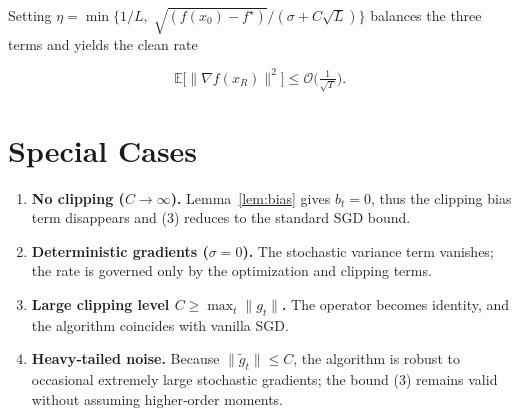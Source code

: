 \documentclass{article}
\newcommand{\E}{\mathbb{E}}
\begin{document}
Setting $\eta = \min\!\bigl\{1/L,\; \sqrt{(f(x_0)-f^{\star})}/(\sigma+C\sqrt{L})\bigr\}$ balances the three terms and yields the clean rate

\[
\E\!\bigl[\|\nabla f(x_R)\|^{2}\bigr]\le
\mathcal O\!\bigl(\tfrac{1}{\sqrt{T}}\bigr).
\]

\section*{Special Cases}
\begin{enumerate}
\item \textbf{No clipping ($C\to\infty$).} Lemma~\ref{lem:bias} gives $b_t=0$, thus the clipping bias term disappears and (3) reduces to the standard SGD bound.
\item \textbf{Deterministic gradients ($\sigma=0$).} The stochastic variance term vanishes; the rate is governed only by the optimization and clipping terms.
\item \textbf{Large clipping level $C\ge \max_t\|g_t\|$.} The operator becomes identity, and the algorithm coincides with vanilla SGD.
\item \textbf{Heavy‑tailed noise.} Because $\|\tilde g_t\|\le C$, the algorithm is robust to occasional extremely large stochastic gradients; the bound (3) remains valid without assuming higher‑order moments.
\end{enumerate}
\end{document}
